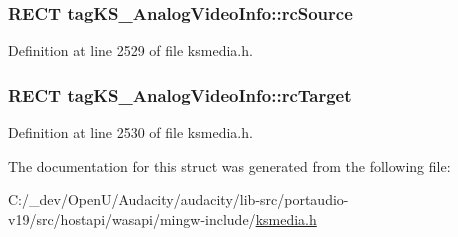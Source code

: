 \subsubsection[{\texorpdfstring{rc\+Source}{rcSource}}]{\setlength{\rightskip}{0pt plus 5cm}R\+E\+CT tag\+K\+S\+\_\+\+Analog\+Video\+Info\+::rc\+Source}\hypertarget{structtag_k_s___analog_video_info_a8b911b5afe5a34e801d63ef8392188cf}{}\label{structtag_k_s___analog_video_info_a8b911b5afe5a34e801d63ef8392188cf}


Definition at line 2529 of file ksmedia.\+h.

\subsubsection[{\texorpdfstring{rc\+Target}{rcTarget}}]{\setlength{\rightskip}{0pt plus 5cm}R\+E\+CT tag\+K\+S\+\_\+\+Analog\+Video\+Info\+::rc\+Target}\hypertarget{structtag_k_s___analog_video_info_a50fa6c382f127c5b0337a96ccdfa0e9e}{}\label{structtag_k_s___analog_video_info_a50fa6c382f127c5b0337a96ccdfa0e9e}


Definition at line 2530 of file ksmedia.\+h.



The documentation for this struct was generated from the following file\+:\begin{DoxyCompactItemize}
\item 
C\+:/\+\_\+dev/\+Open\+U/\+Audacity/audacity/lib-\/src/portaudio-\/v19/src/hostapi/wasapi/mingw-\/include/\hyperlink{ksmedia_8h}{ksmedia.\+h}\end{DoxyCompactItemize}
